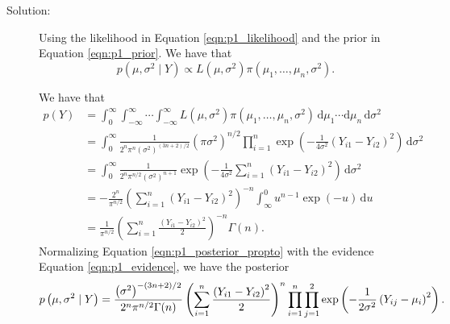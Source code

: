 \documentclass[letterpaper,11pt]{article}
\begin{document}
\begin{enumerate}
\begin{enumerate}
      \begin{description}
      \item[Solution:] Using the likelihood in Equation \ref{eqn:p1_likelihood}
        and the prior in Equation \ref{eqn:p1_prior}. We have that
        \begin{equation}
          p\left(\mu, \sigma^2 \mid Y\right) \propto L\left(\mu, \sigma^2\right)\pi\left(
            \mu_1,\ldots,\mu_n,\sigma^2
          \right).
          \label{eqn:p1_posterior_propto}
        \end{equation}

        We have that
        \begin{align}
          p\left(Y\right)
          &= \int_{0}^\infty\int_{-\infty}^{\infty}\cdots\int_{-\infty}^{\infty}
          L\left(\mu, \sigma^2\right)\pi\left(\mu_1,\ldots,\mu_n,\sigma^2\right)\,\mathrm{d}\mu_1\cdots
            \mathrm{d}\mu_n\,\mathrm{d}\sigma^2 \nonumber\\
          &= \int_{0}^\infty \frac{1}{2^n\pi^n\left(\sigma^2\right)^{(3n + 2)/2}} \left(\pi\sigma^2\right)^{n/2}
            \prod_{i=1}^n \exp\left(-\frac{1}{4\sigma^2}\left(Y_{i1} - Y_{i2}\right)^2\right)
            \,\mathrm{d}\sigma^2 \nonumber\\
          &= \int_{0}^\infty \frac{1}{2^n\pi^{n/2}\left(\sigma^2\right)^{n + 1}}
            \exp\left(-\frac{1}{4\sigma^2}\sum_{i=1}^n \left(Y_{i1} - Y_{i2}\right)^2\right)
            \,\mathrm{d}\sigma^2 \nonumber\\
          &= -\frac{2^n}{\pi^{n/2}}\left(\sum_{i=1}^n \left(Y_{i1} - Y_{i2}\right)^2\right)^{-n}
            \int_\infty^0u^{n-1}\exp\left(-u\right)\,\mathrm{d}u \nonumber\\
          &= \frac{1}{\pi^{n/2}}\left(\sum_{i=1}^n \frac{\left(Y_{i1} - Y_{i2}\right)^2}{2}\right)^{-n}\Gamma(n).
            \label{eqn:p1_evidence}
        \end{align}
        Normalizing Equation \ref{eqn:p1_posterior_propto} with the evidence
        Equation \ref{eqn:p1_evidence}, we have the posterior
        \begin{equation}
          \tiny
          p\left(\mu, \sigma^2 \mid Y\right)
          =
          \frac{\left(\sigma^2\right)^{-(3n+2)/2}}{2^n\pi^{n/2}\Gamma(n)}
          \left(\sum_{i=1}^n \frac{\left(Y_{i1} - Y_{i2}\right)^2}{2}\right)^{n}
          \prod_{i=1}^n \prod_{j=1}^2 \exp\left(
            -\frac{1}{2\sigma^2}\left(Y_{ij} - \mu_i\right)^2
          \right).
          \label{eqn:p1_posterior}
        \end{equation}


\end{description}
\end{enumerate}
\end{enumerate}
\end{document}
